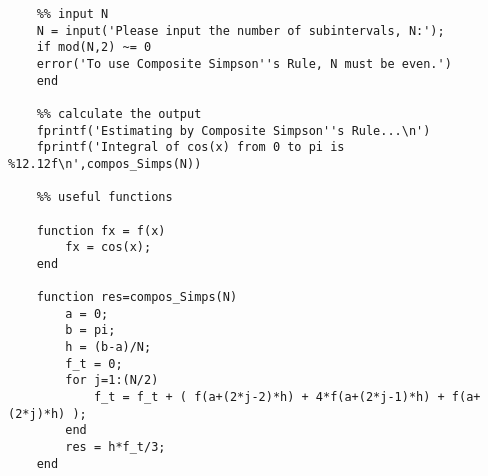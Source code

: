 \documentclass[11pt]{article}
\begin{document}
\begin{itemize}
\begin{verbatim}
	%% input N
	N = input('Please input the number of subintervals, N:');
	if mod(N,2) ~= 0
	error('To use Composite Simpson''s Rule, N must be even.')
	end
	
	%% calculate the output
	fprintf('Estimating by Composite Simpson''s Rule...\n')
	fprintf('Integral of cos(x) from 0 to pi is %12.12f\n',compos_Simps(N))
	
	%% useful functions
	
	function fx = f(x)
	    fx = cos(x);
	end
	
	function res=compos_Simps(N)
	    a = 0;
	    b = pi;
	    h = (b-a)/N;
	    f_t = 0;
	    for j=1:(N/2)
	        f_t = f_t + ( f(a+(2*j-2)*h) + 4*f(a+(2*j-1)*h) + f(a+(2*j)*h) );
	    end
	    res = h*f_t/3;
	end
	\end{verbatim}

	
\end{itemize}
\end{document}
